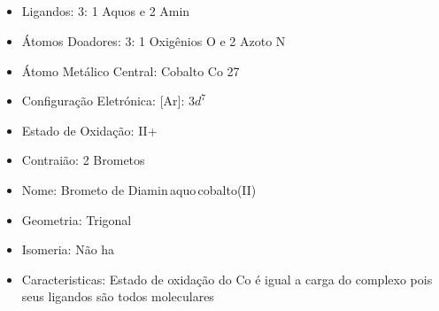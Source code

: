 \documentclass[12pt]{article}
\begin{document}
	\subsection{}
	\begin{itemize}
   
   
   \item Ligandos: 3: 1 Aquos  e 2 Amin
   
   
   \item Átomos Doadores: 3: 1 Oxigênios O e 2 Azoto N
   
   \item Átomo Metálico Central: Cobalto Co 27
   
   \item Configuração Eletrónica: [Ar]: $ 3d^7 $
   
   \item Estado de Oxidação: II+
   
   \item Contraião: 2 Brometos 
   
   \item Nome: Brometo de Diamin\,aquo\,cobalto(II)
   
   \item Geometria: Trigonal
   
   \item Isomeria: Não ha

	\item Caracteristicas: Estado de oxidação do Co é igual a carga do complexo pois seus ligandos são todos moleculares

	\end{itemize}
	
\break


	
\end{document}
